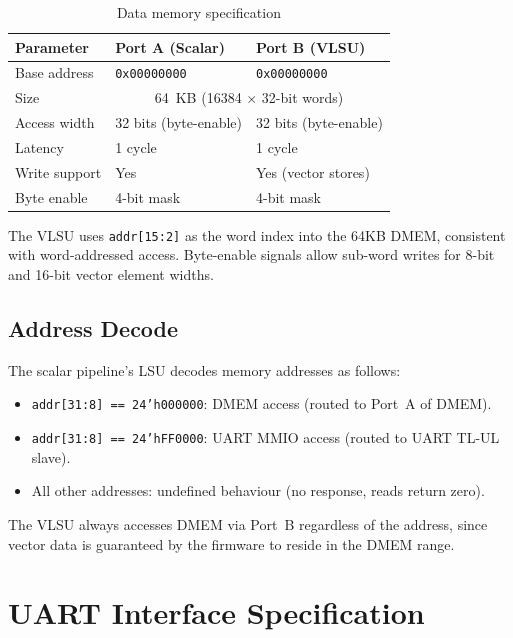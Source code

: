 \begin{table}[H]
  \centering
  \caption{Data memory specification}
  \label{tab:dmem-spec}
  \begin{tabular}{@{}lll@{}}
    \toprule
    \textbf{Parameter} & \textbf{Port A (Scalar)} & \textbf{Port B (VLSU)} \\
    \midrule
    Base address   & \texttt{0x00000000} & \texttt{0x00000000} \\
    Size           & \multicolumn{2}{c}{64~KB (16384 $\times$ 32-bit words)} \\
    Access width   & 32 bits (byte-enable) & 32 bits (byte-enable) \\
    Latency        & 1 cycle              & 1 cycle \\
    Write support  & Yes                  & Yes (vector stores) \\
    Byte enable    & 4-bit mask           & 4-bit mask \\
    \bottomrule
  \end{tabular}
\end{table}

The VLSU uses \texttt{addr[15:2]} as the word index into the 64KB DMEM, consistent
with word-addressed access. Byte-enable signals allow sub-word writes for 8-bit and
16-bit vector element widths.

\subsection{Address Decode}

The scalar pipeline's LSU decodes memory addresses as follows:

\begin{itemize}
  \item \texttt{addr[31:8] == 24'h000000}: DMEM access (routed to Port~A of DMEM).
  \item \texttt{addr[31:8] == 24'hFF0000}: UART MMIO access (routed to UART TL-UL slave).
  \item All other addresses: undefined behaviour (no response, reads return zero).
\end{itemize}

The VLSU always accesses DMEM via Port~B regardless of the address, since vector
data is guaranteed by the firmware to reside in the DMEM range.

\section{UART Interface Specification}
\label{sec:uart-spec}

